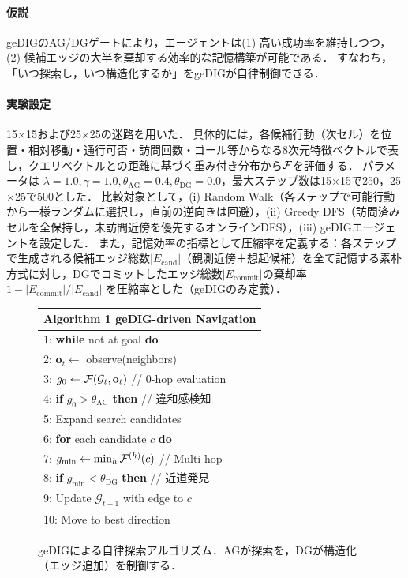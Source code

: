 \paragraph{仮説}
geDIGのAG/DGゲートにより，エージェントは(1) 高い成功率を維持しつつ，(2) 候補エッジの大半を棄却する効率的な記憶構築が可能である．
すなわち，「いつ探索し，いつ構造化するか」をgeDIGが自律制御できる．

\paragraph{実験設定}
15$\times$15および25$\times$25の迷路を用いた．
具体的には，各候補行動（次セル）を位置・相対移動・通行可否・訪問回数・ゴール等からなる8次元特徴ベクトルで表し，クエリベクトルとの距離に基づく重み付き分布から$\mathcal{F}$を評価する．
パラメータは $\lambda=1.0, \gamma=1.0, \theta_{\mathrm{AG}}=0.4, \theta_{\mathrm{DG}}=0.0$，最大ステップ数は15$\times$15で250，25$\times$25で500とした．
比較対象として，(i) Random Walk（各ステップで可能行動から一様ランダムに選択し，直前の逆向きは回避），(ii) Greedy DFS（訪問済みセルを全保持し，未訪問近傍を優先するオンラインDFS），(iii) geDIGエージェントを設定した．
また，記憶効率の指標として圧縮率を定義する：各ステップで生成される候補エッジ総数$|E_{\mathrm{cand}}|$（観測近傍＋想起候補）を全て記憶する素朴方式に対し，DGでコミットしたエッジ総数$|E_{\mathrm{commit}}|$の棄却率 $1-|E_{\mathrm{commit}}|/|E_{\mathrm{cand}}|$ を圧縮率とした（geDIGのみ定義）．

\begin{figure}[h]
\centering
\begin{tabular}{l}
\toprule
\textbf{Algorithm 1} geDIG-driven Navigation \\
\midrule
1: \textbf{while} not at goal \textbf{do} \\
2: \quad $\mathbf{o}_t \leftarrow$ observe(neighbors) \\
3: \quad $g_0 \leftarrow \mathcal{F}(\mathcal{G}_t, \mathbf{o}_t)$ \quad // 0-hop evaluation \\
4: \quad \textbf{if} $g_0 > \theta_{\mathrm{AG}}$ \textbf{then} \quad // 違和感検知 \\
5: \quad \quad Expand search candidates \\
6: \quad \textbf{for} each candidate $c$ \textbf{do} \\
7: \quad \quad $g_{\min} \leftarrow \min_h \mathcal{F}^{(h)}(c)$ \quad // Multi-hop \\
8: \quad \quad \textbf{if} $g_{\min} < \theta_{\mathrm{DG}}$ \textbf{then} \quad // 近道発見 \\
9: \quad \quad \quad Update $\mathcal{G}_{t+1}$ with edge to $c$ \\
10: \quad Move to best direction \\
\bottomrule
\end{tabular}
\caption{geDIGによる自律探索アルゴリズム．AGが探索を，DGが構造化（エッジ追加）を制御する．}
\label{fig:algorithm}
\end{figure}


